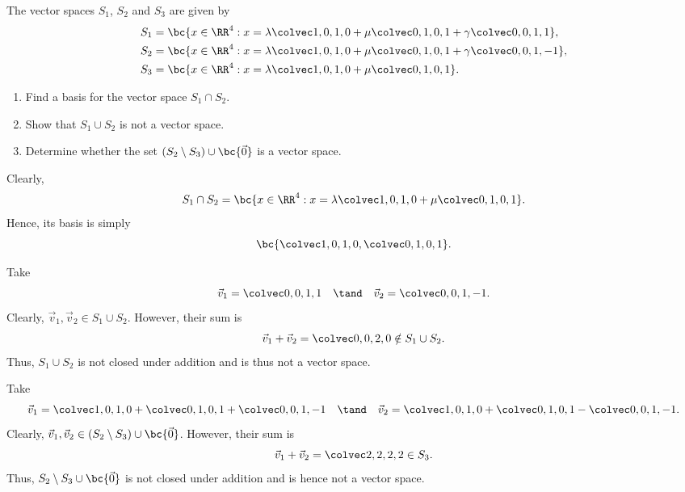 \begin{problem}
    The vector spaces $S_1$, $S_2$ and $S_3$ are given by
    \begin{align*}
        S_1 &= \bc{x \in \RR^4 : x = \l \cveciv1010 + \m \cveciv0101 + \g \cveciv0011},\\
        S_2 &= \bc{x \in \RR^4 : x = \l \cveciv1010 + \m \cveciv0101 + \g \cveciv001{-1}},\\
        S_3 &= \bc{x \in \RR^4 : x = \l \cveciv1010 + \m \cveciv0101}.
    \end{align*}
    
    \begin{enumerate}
        \item Find a basis for the vector space $S_1 \cap S_2$.
        \item Show that $S_1 \cup S_2$ is not a vector space.
        \item Determine whether the set $(S_2 \setminus S_3) \cup \bc{\vec 0}$ is a vector space.
    \end{enumerate}
\end{problem}
\begin{solution}
    \begin{ppart}
        Clearly, \[S_1 \cap S_2 = \bc{x \in \RR^4 : x = \l \cveciv1010 + \m \cveciv0101}.\] Hence, its basis is simply \[\bc{\cveciv1010, \cveciv0101}.\]
    \end{ppart}
    \begin{ppart}
        Take \[\vec v_1 = \cveciv0011 \quad \tand \quad \vec v_2 = \cveciv001{-1}.\] Clearly, $\vec v_1, \vec v_2 \in S_1 \cup S_2$. However, their sum is \[\vec v_1 + \vec v_2 = \cveciv002{0} \notin S_1 \cup S_2.\] Thus, $S_1 \cup S_2$ is not closed under addition and is thus not a vector space.
    \end{ppart}
    \begin{ppart}
        Take \[\vec v_1 = \cveciv1010 + \cveciv0101 + \cveciv001{-1} \quad \tand \quad \vec v_2 = \cveciv1010 + \cveciv0101 - \cveciv001{-1}.\] Clearly, $\vec v_1, \vec v_2 \in (S_2 \setminus S_3) \cup \bc{\vec 0}$. However, their sum is \[\vec v_1 + \vec v_2 = \cveciv2222 \in S_3.\] Thus, $S_2 \setminus S_3 \cup \bc{\vec 0}$ is not closed under addition and is hence not a vector space.
    \end{ppart}
\end{solution}

